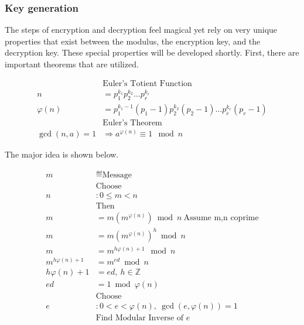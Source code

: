 \documentclass[journal]{IEEEtran}
\begin{document}
\subsubsection{Key generation}

The steps of encryption and decryption feel magical yet rely on very unique
properties that exist between the modulus, the encryption key, and the
decryption key. These special properties will be developed shortly. First, there
are important theorems that are utilized.

\begin{align*}
                  & \text{Euler's Totient Function}                                                       \\
    n             & =p_{1}^{k_{1}} p_{2}^{k_{2}} \dotsc p_{r}^{k_{r}}                                     \\
    \varphi ( n)  & =p_{1}^{k_{1} -1}( p_{1} -1) p_{2}^{k_{2}}( p_{2} -1) \dotsc p_{r}^{k_{r}}( p_{r} -1) \\
                  & \text{Euler's Theorem}                                                                \\
    \gcd( n,a) =1 & \Longrightarrow a^{\varphi ( n)} \equiv 1\ \bmod n
\end{align*}

The major idea is shown below.

\begin{align*}
    m                    & \eqdef \text{Message}                                              \\
                         & \text{Choose}                                                      \\
    n                    & :0\leqslant m< n                                                   \\
                         & \text{Then}                                                        \\
    m                    & =m\left( m^{\varphi ( n)}\right)\bmod n\ \text{Assume m,n coprime} \\
    m                    & =m\left( m^{\varphi ( n)}\right)^{h}\bmod n                        \\
    m                    & =m^{h\varphi ( n) +1} \ \bmod n                                    \\
    m^{h\varphi ( n) +1} & =m^{ed}\bmod n                                                     \\
    h\varphi ( n) +1     & =ed,\ h\in \mathbb{Z}                                              \\
    ed                   & =1\bmod \varphi ( n)                                               \\
                         & \text{Choose}                                                      \\
    e                    & :0< e< \varphi ( n) ,\ \gcd\left( e,\varphi ( n)\right) =1\        \\
                         & \text{Find Modular Inverse of } e
\end{align*}
\end{document}
